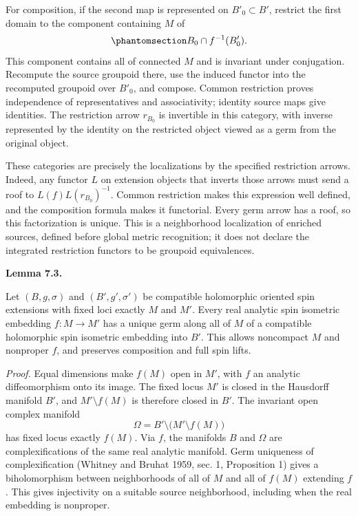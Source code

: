\documentclass[
  english,
  11pt,
  reqno]{amsart}
\makeatletter
\newcommand{\pandocstatementheading}[1]{%
  \par\addpenalty{\@beginparpenalty}%
  \addvspace{.5\baselineskip plus .2\baselineskip minus .2\baselineskip}%
  {\normalfont\bfseries #1\par}%
  \nobreak\@afterindenttrue\@afterheading
}
\makeatother
\begin{document}
For composition, if the second map is represented on \(B'_0\subset B'\),
restrict the first domain to the component containing \(M\) of
\begin{equation}\protect\phantomsection\label{eq:monodromy-germ-composition-domain}{
B_0\cap f^{-1}(B'_0).
}\end{equation} This component contains all of connected \(M\) and is
invariant under conjugation. Recompute the source groupoid there, use
the induced functor into the recomputed groupoid over \(B'_0\), and
compose. Common restriction proves independence of representatives and
associativity; identity source maps give identities. The restriction
arrow \(r_{B_0}\) is invertible in this category, with inverse
represented by the identity on the restricted object viewed as a germ
from the original object.

These categories are precisely the localizations by the specified
restriction arrows. Indeed, any functor \(L\) on extension objects that
inverts those arrows must send a roof to \(L(f)L(r_{B_0})^{-1}\). Common
restriction makes this expression well defined, and the composition
formula makes it functorial. Every germ arrow has a roof, so this
factorization is unique. This is a neighborhood localization of enriched
sources, defined before global metric recognition; it does not declare
the integrated restriction functors to be groupoid equivalences.

\pandocstatementheading{\protect{}\label{lem:whole-real-isometry-complexification}Lemma 7.3.}

Let \((B,g,\sigma)\) and \((B',g',\sigma')\) be compatible holomorphic
oriented spin extensions with fixed loci exactly \(M\) and \(M'\). Every
real analytic spin isometric embedding \(f:M\to M'\) has a unique germ
along all of \(M\) of a compatible holomorphic spin isometric embedding
into \(B'\). This allows noncompact \(M\) and nonproper \(f\), and
preserves composition and full spin lifts.

\emph{Proof.} Equal dimensions make \(f(M)\) open in \(M'\), with \(f\)
an analytic diffeomorphism onto its image. The fixed locus \(M'\) is
closed in the Hausdorff manifold \(B'\), and \(M'\setminus f(M)\) is
therefore closed in \(B'\). The invariant open complex manifold \[
\Omega=B'\setminus\bigl(M'\setminus f(M)\bigr)
\] has fixed locus exactly \(f(M)\). Via \(f\), the manifolds \(B\) and
\(\Omega\) are complexifications of the same real analytic manifold.
Germ uniqueness of complexification (Whitney and Bruhat 1959, sec. 1,
Proposition 1) gives a biholomorphism between neighborhoods of all of
\(M\) and all of \(f(M)\) extending \(f\). This gives injectivity on a
suitable source neighborhood, including when the real embedding is
nonproper.
\end{document}

